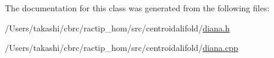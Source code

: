 The documentation for this class was generated from the following files\+:\begin{DoxyCompactItemize}
\item 
/\+Users/takashi/cbrc/ractip\+\_\+hom/src/centroidalifold/\hyperlink{diana_8h}{diana.\+h}\item 
/\+Users/takashi/cbrc/ractip\+\_\+hom/src/centroidalifold/\hyperlink{diana_8cpp}{diana.\+cpp}\end{DoxyCompactItemize}
